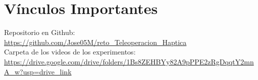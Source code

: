 \documentclass[journal,10pt,twoside]{IEEEtran}
\begin{document}
\section*{Vínculos Importantes}

Repositorio en Github:
\url{https://github.com/Jose05M/reto_Teleoperacion_Haptica}
\\

Carpeta de los videos de los experimentos:
\url{https://drive.google.com/drive/folders/1Bs8ZEHBYy82A9pPPE2zRgDqqtY2mnA_w?usp=drive_link}
\end{document}
